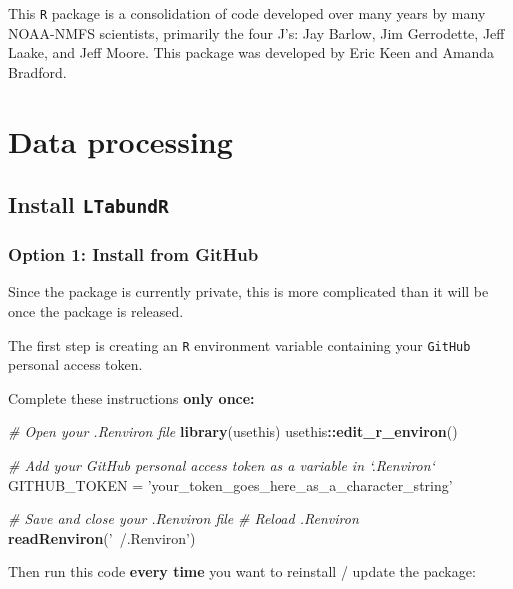 \documentclass[
]{book}
\newenvironment{Shaded}{\begin{snugshade}}{\end{snugshade}}
\newcommand{\CommentTok}[1]{\textcolor[rgb]{0.56,0.35,0.01}{\textit{#1}}}
\newcommand{\KeywordTok}[1]{\textcolor[rgb]{0.13,0.29,0.53}{\textbf{#1}}}
\newcommand{\NormalTok}[1]{#1}
\newcommand{\OperatorTok}[1]{\textcolor[rgb]{0.81,0.36,0.00}{\textbf{#1}}}
\newcommand{\StringTok}[1]{\textcolor[rgb]{0.31,0.60,0.02}{#1}}
\begin{document}
This \texttt{R} package is a consolidation of code developed over many years by many NOAA-NMFS scientists, primarily the four J's: Jay Barlow, Jim Gerrodette, Jeff Laake, and Jeff Moore. This package was developed by Eric Keen and Amanda Bradford.

\hypertarget{part-data-processing}{%
\part{Data processing}\label{part-data-processing}}

\hypertarget{install}{%
\chapter{\texorpdfstring{Install \texttt{LTabundR}}{Install LTabundR}}\label{install}}

\hypertarget{option-1-install-from-github}{%
\section*{Option 1: Install from GitHub}\label{option-1-install-from-github}}

Since the package is currently private, this is more complicated than it will be once the package is released.

The first step is creating an \texttt{R} environment variable containing your \texttt{GitHub} personal access token.

Complete these instructions \textbf{only once:}

\begin{Shaded}
\begin{Highlighting}[]
\CommentTok{# Open your .Renviron file}
\KeywordTok{library}\NormalTok{(usethis)}
\NormalTok{usethis}\OperatorTok{::}\KeywordTok{edit_r_environ}\NormalTok{()}

\CommentTok{# Add your GitHub personal access token as a variable in `.Renviron`}
\NormalTok{GITHUB_TOKEN =}\StringTok{ 'your_token_goes_here_as_a_character_string'}

\CommentTok{# Save and close your .Renviron file}
\CommentTok{# Reload .Renviron}
\KeywordTok{readRenviron}\NormalTok{(}\StringTok{'~/.Renviron'}\NormalTok{)}
\end{Highlighting}
\end{Shaded}

Then run this code \textbf{every time} you want to reinstall / update the package:
\end{document}
